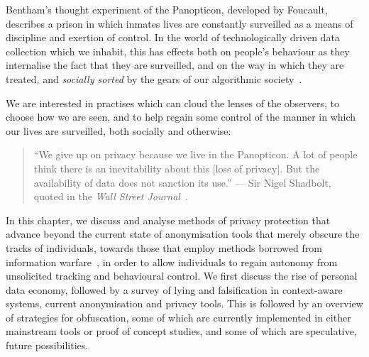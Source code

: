 \documentclass{IOS-Book-Article}     %
\begin{document}


Bentham's thought experiment of the Panopticon, developed by Foucault, describes
a prison in which inmates lives are constantly surveilled as a means of
discipline and exertion of control.  In the world of technologically driven data collection which we inhabit, this has effects both on people's behaviour as they internalise the fact that they are surveilled, and on the way in which they are treated, and \emph{socially sorted} by the gears of our algorithmic society~\cite{simon2005Panopticism}.

We are interested in practises which can cloud the lenses of the observers, to
choose how we are seen, and to help regain some control of
the manner in which our lives are surveilled, both socially and otherwise:
\begin{quote}``We give up on privacy because we live in the Panopticon. A lot of
people think there is an inevitability about this [loss of privacy]. But the
availability of data does not sanction its use.'' --- Sir Nigel Shadbolt,
quoted in the \emph{Wall Street Journal}~\cite{rooney2012OpenData}.\end{quote}


In this chapter, we discuss and analyse methods of privacy protection that
advance beyond the current state of anonymisation tools that merely obscure the tracks
of individuals, towards those that employ methods borrowed from
information warfare~\cite{gursestranslating,lyon2007surveillance}, in order to allow individuals to regain autonomy
from unsolicited tracking and behavioural control.  We first discuss the rise of 
personal data economy, followed by a survey of lying and falsification in context-aware 
systems, current anonymisation and privacy tools. This is followed by an overview of
strategies for obfuscation, some of which are currently implemented in either
mainstream tools or proof of concept studies,  and some of which are
speculative, future possibilities.
\end{document}
